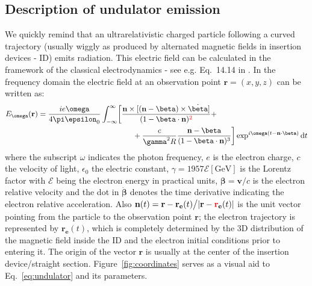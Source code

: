 \documentclass{iucr}              %
\newcommand{\inred}[1]{{\color{red}#1}}
\begin{document}
\subsection{Description of undulator emission}
\label{sec:undulator}

We quickly remind that an ultrarelativistic charged particle following a curved trajectory (usually wiggly as produced by alternated magnetic fields in insertion devices - ID) emits radiation. This electric field can be calculated in the framework of the classical electrodynamics - see e.g. Eq.~14.14 in \cite{jackson}. In the frequency domain the electric field at an observation point $\textbf{r}=(x,y,z)$ can be written as: 
\begin{equation}
\begin{split}
    E_{\omega}(\textbf{r}) = \frac{i e \omega}{4 \pi \epsilon_0} 
    \int_{-\infty}^{\infty}
    &\biggl[ 
    \frac{\textbf{n} \times [(\textbf{n} - \mathbf{\beta}) \times \dot{\mathbf{\beta}}]}
    {(1- \mathbf{\beta} \cdot \textbf{n})^\inred{2}} +\\
    &\qquad+\frac{c}{\gamma^2 R}   \frac{\textbf{n} - \mathbf{\beta}}{(1-\mathbf{\beta} \cdot \textbf{n})^3} \biggr]
    \exp^{i \omega (t - \textbf{n}\cdot\mathbf{\beta})} \mathrm{d}t
\end{split}\label{eq:undulator}
\end{equation}
where the subscript $\omega$ indicates the photon frequency, $e$ is the electron charge, $c$ the velocity of light, $\epsilon_0$ the electric constant, $\gamma=1957\mathcal{E}[\mathrm{GeV}]$ is the Lorentz factor with $\mathcal{E}$ being the electron energy in practical units, $\mathbf{\beta}=\mathbf{v}\big/c$ is the electron relative velocity and the dot in $\dot{\mathbf{\beta}}$ denotes the time derivative indicating the electron relative acceleration. Also $\textbf{n}(t)=\textbf{r}-\textbf{r}_{\textbf{e}}(t)\big/|\textbf{r}-\textbf{\inred{r}}_{\textbf{e}}(t)|$ is the unit vector pointing from the particle to the observation point $\textbf{r}$; the electron trajectory is represented by $\textbf{r}_{\textbf{e}}(t)$, which is completely determined by the 3D distribution of the magnetic field inside the ID and the electron initial conditions prior to entering it. The origin of the vector $\textbf{r}$ is usually at the center of the insertion device/straight section. Figure~\ref{fig:coordinates} serves as a visual aid to Eq.~\ref{eq:undulator} and its parameters. 
\end{document}
